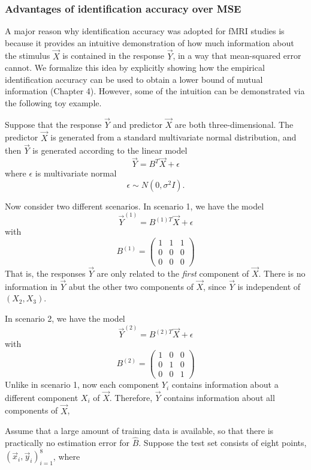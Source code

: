 \subsubsection{Advantages of identification accuracy over MSE}

A major reason why identification accuracy was adopted for fMRI
studies is because it provides an intuitive demonstration of how much
information about the stimulus $\vec{X}$ is contained in the response
$\vec{Y}$, in a way that mean-squared error cannot.  We formalize this
idea by explicitly showing how the empirical identification accuracy
can be used to obtain a lower bound of mutual information (Chapter 4).
However, some of the intuition can be demonstrated via the following
toy example.

Suppose that the response $\vec{Y}$ and predictor $\vec{X}$ are both
three-dimensional.  The predictor $\vec{X}$ is generated from a standard
multivariate normal distribution, and then $\vec{Y}$ is generated
according to the linear model
\[
\vec{Y} = B^T \vec{X} + \epsilon
\]
where $\epsilon$ is multivariate normal
\[
\epsilon \sim N(0, \sigma^2 I).
\]

Now consider two different scenarios.  In scenario 1, we have
the model 
\[
\vec{Y}^{(1)} = B^{(1)T} \vec{X} + \epsilon
\]
with
\[
B^{(1)} = \begin{pmatrix}
1 & 1 & 1\\
0 & 0 & 0\\
0 & 0 & 0
\end{pmatrix}
\]
That is, the responses $\vec{Y}$ are only related to the \emph{first}
component of $\vec{X}$.  There is no information in $\vec{Y}$ abut the
other two components of $\vec{X}$, since $\vec{Y}$ is independent of
$(X_2, X_3)$.

In scenario 2, we have the model
\[
\vec{Y}^{(2)} = B^{(2)T} \vec{X} + \epsilon
\]
with
\[
B^{(2)} = \begin{pmatrix}
1 & 0 & 0\\
0 & 1 & 0\\
0 & 0 & 1
\end{pmatrix}
\]
Unlike in scenario 1, now each component $Y_i$ contains information
about a different component $X_i$ of $\vec{X}$.  Therefore, $\vec{Y}$
contains information about all components of $\vec{X}$,

Assume that a large amount of training data is available, so that
there is practically no estimation error for $\hat{B}$.  Suppose the
test set consists of eight points, $(\vec{x}_i, \vec{y}_i)_{i=1}^8$,
where

